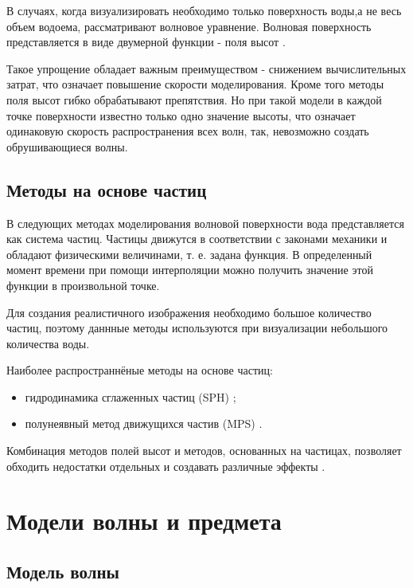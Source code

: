 В случаях, когда визуализировать необходимо только поверхность воды,а не весь объем водоема, рассматривают волновое уравнение. Волновая поверхность представляется в виде двумерной функции - поля высот \cite{field}. 

Такое упрощение обладает важным преимуществом - снижением вычислительных затрат, что означает повышение скорости моделирования. Кроме того методы поля высот гибко обрабатывают препятствия. Но при такой модели в каждой точке поверхности известно только одно значение высоты, что означает одинаковую скорость распространения всех волн, так, невозможно создать обрушивающиеся волны.


\subsection{Методы на основе частиц}

В следующих методах моделирования волновой поверхности вода представляется как система частиц. Частицы движутся в соответствии с законами механики и обладают физическими величинами, т. е. задана функция. В определенный момент времени при помощи интерполяции можно получить значение этой функции в произвольной точке.

Для создания реалистичного изображения необходимо большое количество частиц, поэтому даннные методы используются при визуализации небольшого количества воды.  

Наиболее распространнёные методы на основе частиц:

\begin{itemize}
    \item гидродинамика сглаженных частиц (SPH) \cite{sph};
    \item полунеявный метод движущихся частив (MPS) \cite{mps}.
\end{itemize}

Комбинация методов полей высот и методов, основанных на частицах, позволяет обходить недостатки отдельных и создавать различные эффекты \cite{shallow}\cite{large-small}.

\section{Модели волны и предмета}

\subsection{Модель волны}

